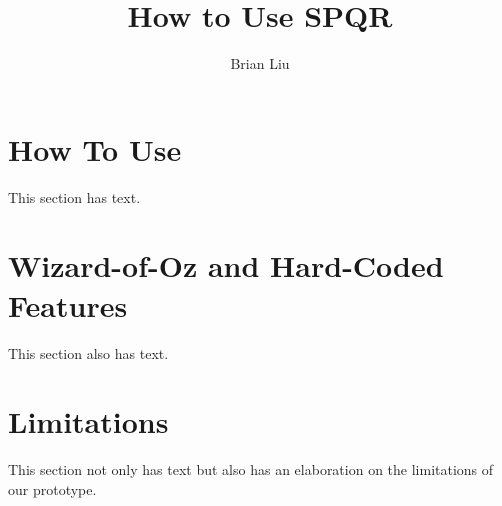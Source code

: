 \documentclass{article}
\title{How to Use SPQR}
\author{Brian Liu}
\begin{document}
\maketitle

\section{How To Use}
This section has text.

\section{Wizard-of-Oz and Hard-Coded Features}
This section also has text.


\section{Limitations}
This section not only has text but also has an elaboration on the limitations of our prototype.
\end{document}
